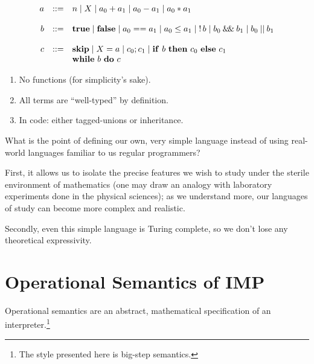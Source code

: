 \begin{frame}
    \[\begin{array}{rcl}
        a & ::= & n
                \mid X
                \mid a_0 + a_1
                \mid a_0 - a_1
                \mid a_0 \ast a_1 \\
                \\
        b & ::= & \mathbf{true}
                \mid \mathbf{false}
                \mid a_0 == a_1
                \mid a_0 \leq a_1
                \mid \progNot b
                \mid b_0 \doubleAmp b_1
                \mid b_0 \doubleBar b_1 \\
                \\
        c & ::= & \mathbf{skip}
                \mid X = a
                \mid c_0; c_1
                \mid \mathbf{if}\ b\ \mathbf{then}\ c_0\ \mathbf{else}\ c_1 \\
                && \mathbf{while}\ b\ \mathbf{do}\ c
    \end{array} \]
    \pause
    \begin{enumerate}
        \item No functions (for simplicity's sake).
        \item All terms are ``well-typed'' by definition.
        \item In code: either tagged-unions or inheritance.
    \end{enumerate}
\end{frame}

What is the point of defining our own, very simple language instead of using
real-world languages familiar to us regular programmers?

First, it allows us to isolate the precise features we wish to study under
the sterile environment of mathematics (one may draw an analogy with
laboratory experiments done in the physical sciences); as we understand more,
our languages of study can become more complex and realistic.

Secondly, even this simple language is Turing complete, so we don't lose any
theoretical expressivity.

\section{Operational Semantics of IMP}

\begin{frame}
  Operational semantics are an abstract, mathematical specification of an
  interpreter.\footnote{The style presented here is big-step semantics.}
\end{frame}

